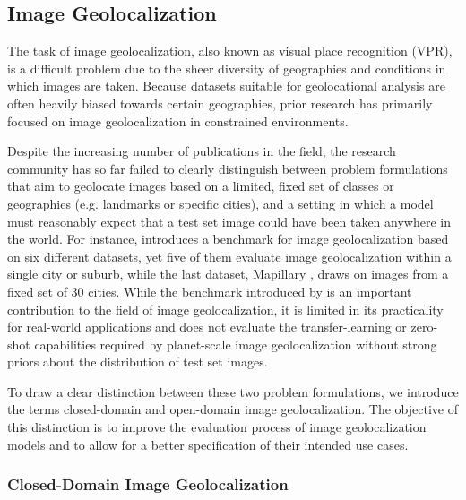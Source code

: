 \documentclass{article}
\renewcommand{\cite}[1]{\citep{#1}}
\begin{document}
\subsection{Image Geolocalization}

The task of image geolocalization, also known as visual place recognition (VPR), is a difficult problem due to the sheer diversity of geographies and conditions in which images are taken. Because datasets suitable for geolocational analysis are often heavily biased towards certain geographies, prior research has primarily focused on image geolocalization in constrained environments.

Despite the increasing number of publications in the field, the research community has so far failed to clearly distinguish between problem formulations that aim to geolocate images based on a limited, fixed set of classes or geographies (e.g. landmarks or specific cities), and a setting in which a model must reasonably expect that a test set image could have been taken anywhere in the world. For instance, \citet{Berton_2022_CVPR} introduces a benchmark for image geolocalization based on six different datasets, yet five of them evaluate image geolocalization within a single city or suburb, while the last dataset, Mapillary \cite{warburg_2022}, draws on images from a fixed set of 30 cities. While the benchmark introduced by \citet{Berton_2022_CVPR} is an important contribution to the field of image geolocalization, it is limited in its practicality for real-world applications and does not evaluate the transfer-learning or zero-shot capabilities required by planet-scale image geolocalization without strong priors about the distribution of test set images. 

To draw a clear distinction between these two problem formulations, we introduce the terms closed-domain and open-domain image geolocalization. The objective of this distinction is to improve the evaluation process of image geolocalization models and to allow for a better specification of their intended use cases.

\subsubsection{Closed-Domain Image Geolocalization}
\end{document}
